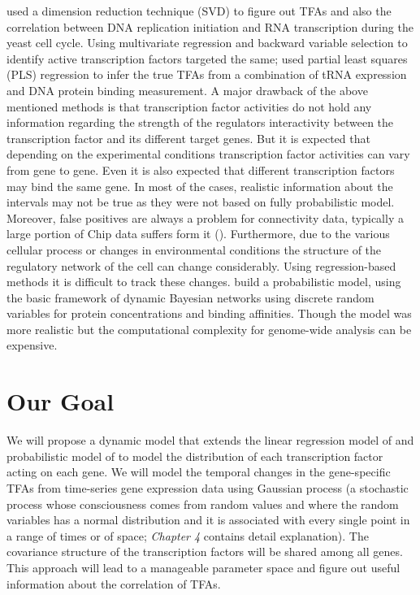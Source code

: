 \cite{Alter:2004} used a dimension reduction technique (SVD) to figure out TFAs and also the 
correlation between DNA replication initiation and RNA transcription during the yeast cell cycle. 
Using multivariate regression and backward variable selection 
to identify active transcription factors \cite{Gao:2004} targeted the same; 
\cite{Boulesteix:2005} used partial least squares (PLS) regression to infer the true TFAs 
from a combination of tRNA expression and DNA protein binding measurement. 
A major drawback of the above mentioned methods is that transcription factor activities do not 
hold any information regarding the strength of the regulators interactivity between the 
transcription factor and its different target genes. But it is expected that 
depending on the experimental conditions transcription factor activities can vary from gene to gene. 
Even it is also expected that different transcription factors may bind the same gene. 
In most of the cases, realistic information about the intervals may not be true as they were 
not based on fully probabilistic model. Moreover, false positives are always a problem for 
connectivity data, typically a large portion of Chip data suffers form it 
(\cite{Boulesteix:2005}). 
Furthermore, due to the various cellular process or changes in environmental conditions 
the structure of the regulatory network of the cell can change considerably.
Using regression-based methods it is difficult to track these changes. 
\cite{Nachman:2004} build a probabilistic model, using the basic framework of 
dynamic Bayesian networks using discrete random variables for protein concentrations 
and binding affinities. Though the model was more realistic but the computational complexity for 
genome-wide analysis can be expensive.

\section{Our Goal}
We will propose a dynamic model that extends the linear regression model of \cite{Liao:2003} 
and probabilistic model of \cite{Sanguinetti:2006} to model the distribution of each transcription 
factor acting on each gene. We will model the temporal changes in the gene-specific TFAs from 
time-series gene expression data using Gaussian process (a stochastic process whose consciousness comes from 
random values and where the random variables has a normal distribution and it is associated with every single 
point in a range of times or of space; \textit{Chapter 4} contains detail explanation). 
The covariance structure of the transcription factors will be shared among all genes. 
This approach will lead to a manageable parameter space and figure out useful information about the 
correlation of TFAs.

